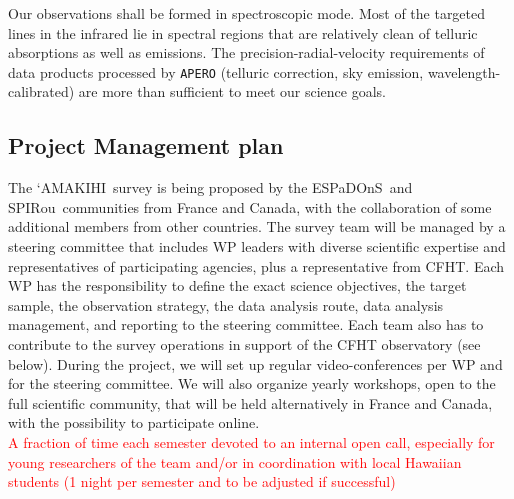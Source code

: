 \documentclass[
    traditabstract,
    longauth,
    onecolumn,
]{aa}
\def \amakihi{`AMAKIHI}
\def \spi{SPIRou}
\def \esp{ESPaDOnS}
\begin{document}
Our observations shall be formed in spectroscopic mode. Most of the targeted lines in the infrared lie in spectral regions that are relatively clean of telluric absorptions as well as emissions. The precision-radial-velocity requirements of data products processed by \texttt{APERO} (telluric correction, sky emission, wavelength-calibrated) are more than sufficient to meet our science goals.  %



\subsection{Project Management plan}
The \amakihi\ survey is being proposed by the \esp\ and \spi\ communities from France and Canada, with the collaboration of some additional members from other countries. The survey team will be managed by a steering committee that includes WP leaders with diverse scientific expertise and representatives of participating agencies, plus a representative from CFHT. Each WP has the responsibility to define the exact science objectives, the target sample, the observation strategy, the data analysis route, data analysis management, and reporting to the steering committee. Each team also has to contribute to the survey operations in support of the CFHT observatory (see below). During the project, we will set up regular video-conferences per WP and for the steering committee. We will also organize yearly workshops, open to the full scientific community, that will be held alternatively in France and Canada, with the possibility to participate online.\\
\textcolor{red}{A fraction of time each semester devoted to an internal open call, especially for young researchers of the team and/or in coordination with local Hawaiian students (1 night per semester and to be adjusted if successful)}

\end{document}
